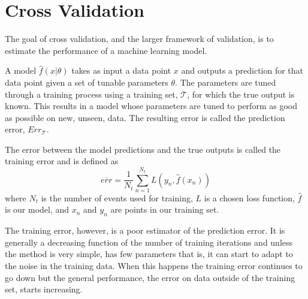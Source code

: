 

%
%
%
%
%


\section{Cross Validation}

The goal of cross validation, and the larger framework of validation, is to estimate the performance of a machine learning model.

A model $\hat{f}(x | \theta)$ takes as input a data point $x$ and outputs a prediction for that data point given a set of tunable parameters $\theta$. The parameters are tuned through a training process using a training set, $\mathcal{T}$, for which the true output is known. This results in a model whose parameters are tuned to perform as good as possible on new, unseen, data. The resulting error is called the prediction error, $Err_{\mathcal{T}}$.

The error between the model predictions and the true outputs is called the training error and is defined as
\begin{equation}
\overline{err} = \frac{1}{N_t}\sum_{n=1}^{N_t}L(y_n, \hat{f}(x_n))
\label{eq:eq:train.err}
\end{equation}
where $N_t$ is the number of events used for training, $L$ is a chosen loss function, $\hat{f}$ is our model, and $x_n$ and $y_n$ are points in our training set.

The training error, however, is a poor estimator of the prediction error. It is generally a decreasing function of the number of training iterations and unless the method is very simple, has few parameters that is, it can start to adapt to the noise in the training data. When this happens the training error continues to go down but the general performance, the error on data outside of the training set, starts increasing.

